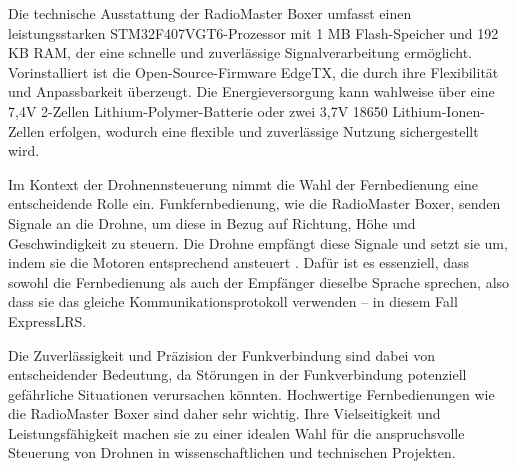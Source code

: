 Die technische Ausstattung der RadioMaster Boxer umfasst einen leistungsstarken STM32\-F407VGT6-Prozessor mit 1 MB Flash-Speicher und 192 KB RAM, der eine schnelle und zuverlässige Signalverarbeitung ermöglicht. Vorinstalliert ist die Open-Source-Firmware EdgeTX, die durch ihre Flexibilität und Anpassbarkeit überzeugt. %
Die Energieversorgung kann wahlweise über eine 7,4V 2-Zellen Lithium-Polymer-Batterie oder zwei 3,7V 18650 Lithium-Ionen-Zellen erfolgen, wodurch eine flexible und zuverlässige Nutzung sichergestellt wird.\cite{RadioController}\cite{ATOMRC}

Im Kontext der Drohnennsteuerung nimmt die Wahl der Fernbedienung eine entscheidende Rolle ein. Funkfernbedienung, wie die RadioMaster Boxer, senden Signale an die Drohne, um diese in Bezug auf Richtung, Höhe und Geschwindigkeit zu steuern. Die Drohne empfängt diese Signale und setzt sie um, indem sie die Motoren entsprechend ansteuert \cite{Steuerung}. Dafür ist es essenziell, dass sowohl die Fernbedienung als auch der Empfänger dieselbe Sprache sprechen, also dass sie das gleiche Kommunikationsprotokoll verwenden – in diesem Fall ExpressLRS. %

Die Zuverlässigkeit und Präzision der Funkverbindung sind dabei von entscheidender Bedeutung, da Störungen in der Funkverbindung potenziell gefährliche Situationen verursachen könnten. Hochwertige Fernbedienungen wie die RadioMaster Boxer sind daher sehr wichtig\cite{Steuerung}. Ihre Vielseitigkeit und Leistungsfähigkeit machen sie zu einer idealen Wahl für die anspruchsvolle Steuerung von Drohnen in wissenschaftlichen und technischen Projekten.


